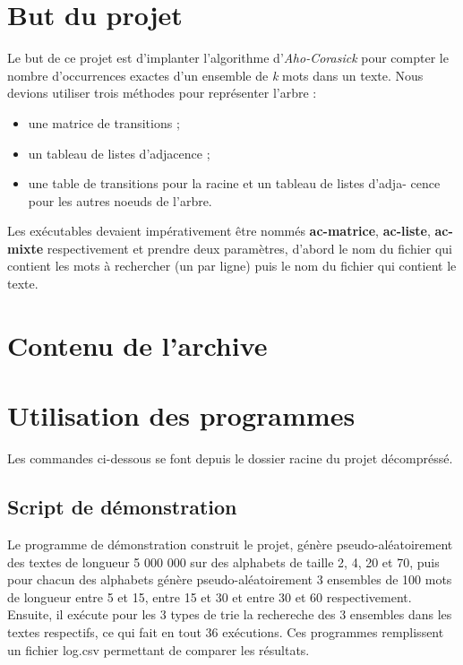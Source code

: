 \section{But du projet}
Le but de ce projet est d'implanter l’algorithme d’\emph{Aho-Corasick} pour compter le
nombre d’occurrences exactes d’un ensemble de \textit{k} mots dans un texte.
Nous devions utiliser trois méthodes pour représenter l’arbre :
\begin{itemize}
\item une matrice de transitions ;
\item un tableau de listes d’adjacence ;
\item une table de transitions pour la racine et un tableau de listes d’adja-
cence pour les autres noeuds de l’arbre.
\end{itemize}
Les exécutables devaient impérativement être nommés \textbf{ac-matrice},
\textbf{ac-liste}, \textbf{ac-mixte} respectivement et prendre deux paramètres,
d’abord le nom du fichier qui contient les mots à rechercher (un par ligne) puis
le nom du fichier qui contient le texte.

\section{Contenu de l'archive}

\newpage
\section{Utilisation des programmes}
Les commandes ci-dessous se font depuis le dossier racine du projet décompréssé.

\subsection{Script de démonstration}
Le programme de démonstration construit le projet, génère pseudo-aléatoirement des
textes de longueur 5 000 000 sur des alphabets de taille 2, 4, 20 et 70, puis
pour chacun des alphabets génère pseudo-aléatoirement 3 ensembles de 100 mots de
longueur entre 5 et 15, entre 15 et 30 et entre 30 et 60 respectivement.
Ensuite, il exécute pour les 3 types de trie la rechereche des 3 ensembles dans
les textes respectifs, ce qui fait en tout 36 exécutions. Ces programmes
remplissent un fichier log.csv permettant de comparer les résultats.

